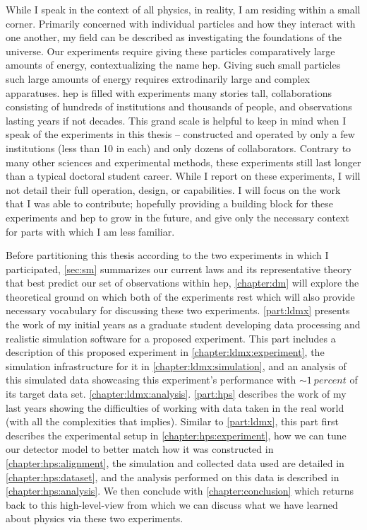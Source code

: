 While I speak in the context of all physics, in reality, I am residing within a small corner.
Primarily concerned with individual particles and how they interact with one another, my field can
be described as investigating the foundations of the universe. Our experiments require giving these
particles comparatively large amounts of energy, contextualizing the name \ac{hep}. Giving such
small particles such large amounts of energy requires extrodinarily large and complex apparatuses.
\ac{hep} is filled with experiments many stories tall, collaborations consisting of hundreds of
institutions and thousands of people, and observations lasting years if not decades. This grand
scale is helpful to keep in mind when I speak of the experiments in this thesis -- constructed and
operated by only a few institutions (less than 10 in each) and only dozens of collaborators.
Contrary to many other sciences and experimental methods, these experiments still last longer than
a typical doctoral student career. While I report on these experiments, I will not detail their
full operation, design, or capabilities. I will focus on the work that I was able to contribute;
hopefully providing a building block for these experiments and \ac{hep} to grow in the future, and
give only the necessary context for parts with which I am less familiar.

Before partitioning this thesis according to the two experiments in which I participated,
\cref{sec:sm} summarizes our current laws and its representative theory that best predict our set
of observations within \ac{hep}, \cref{chapter:dm} will explore the theoretical ground on which
both of the experiments rest which will also provide necessary vocabulary for discussing these two
experiments. \cref{part:ldmx} presents the work of my initial years as a graduate student
developing data processing and realistic simulation software for a proposed experiment. This part
includes a description of this proposed experiment in \cref{chapter:ldmx:experiment}, the
simulation infrastructure for it in \cref{chapter:ldmx:simulation}, and an analysis of this
simulated data showcasing this experiment's performance with $\sim\qty{1}{percent}$ of its target
data set. \cref{chapter:ldmx:analysis}. \cref{part:hps} describes the work of my last years showing
the difficulties of working with data taken in the real world (with all the complexities that
implies). Similar to \cref{part:ldmx}, this part first describes the experimental setup in
\cref{chapter:hps:experiment}, how we can tune our detector model to better match how it was
constructed in \cref{chapter:hps:alignment}, the simulation and collected data used are detailed in
\cref{chapter:hps:dataset}, and the analysis performed on this data is described in
\cref{chapter:hps:analysis}. We then conclude with \cref{chapter:conclusion} which returns back to
this high-level-view from which we can discuss what we have learned about physics via these two
experiments.

